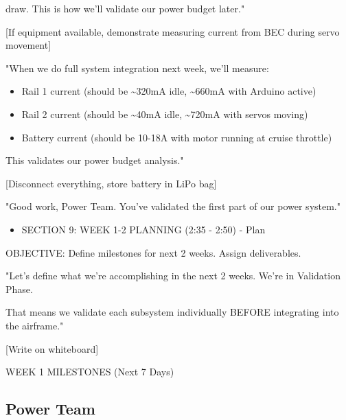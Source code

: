 \documentclass[11pt,letterpaper]{article}
\begin{document}
{draw. This is how we'll validate our power budget later."\par

[If equipment available, demonstrate measuring current from BEC during servo movement]\par

"When we do full system integration next week, we'll measure:\par

\begin{itemize}
  \item Rail 1 current (should be \textasciitilde{}320mA idle, \textasciitilde{}660mA with Arduino active)
  \item Rail 2 current (should be \textasciitilde{}40mA idle, \textasciitilde{}720mA with servos moving)
  \item Battery current (should be 10-18A with motor running at cruise throttle)
\end{itemize}

This validates our power budget analysis."\par

[Disconnect everything, store battery in LiPo bag]\par

"Good work, Power Team. You've validated the first part of our power system."\par

\begin{itemize}
  \item SECTION 9: WEEK 1-2 PLANNING (2:35 - 2:50) - Plan
\end{itemize}

OBJECTIVE: Define milestones for next 2 weeks. Assign deliverables.\par

"Let's define what we're accomplishing in the next 2 weeks. We're in Validation Phase.\par

That means we validate each subsystem individually BEFORE integrating into the airframe."\par

[Write on whiteboard]\par

WEEK 1 MILESTONES (Next 7 Days)\par

\subsection{Power Team}

}
\end{document}
